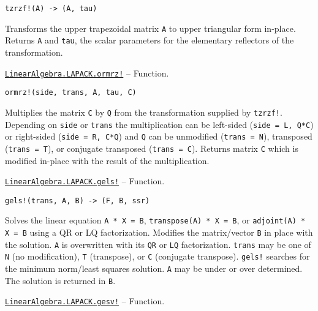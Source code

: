 \begin{adjustwidth}{2em}{0pt}


\begin{verbatim}
tzrzf!(A) -> (A, tau)
\end{verbatim}

Transforms the upper trapezoidal matrix \texttt{A} to upper triangular form in-place. Returns \texttt{A} and \texttt{tau}, the scalar parameters for the elementary reflectors of the transformation.



\end{adjustwidth}
\hypertarget{15550486828362807519}{} 
\hyperlink{15550486828362807519}{\texttt{LinearAlgebra.LAPACK.ormrz!}}  -- {Function.}

\begin{adjustwidth}{2em}{0pt}


\begin{verbatim}
ormrz!(side, trans, A, tau, C)
\end{verbatim}

Multiplies the matrix \texttt{C} by \texttt{Q} from the transformation supplied by \texttt{tzrzf!}. Depending on \texttt{side} or \texttt{trans} the multiplication can be left-sided (\texttt{side = L, Q*C}) or right-sided (\texttt{side = R, C*Q}) and \texttt{Q} can be unmodified (\texttt{trans = N}), transposed (\texttt{trans = T}), or conjugate transposed (\texttt{trans = C}). Returns matrix \texttt{C} which is modified in-place with the result of the multiplication.



\end{adjustwidth}
\hypertarget{18299455515085793306}{} 
\hyperlink{18299455515085793306}{\texttt{LinearAlgebra.LAPACK.gels!}}  -- {Function.}

\begin{adjustwidth}{2em}{0pt}


\begin{verbatim}
gels!(trans, A, B) -> (F, B, ssr)
\end{verbatim}

Solves the linear equation \texttt{A * X = B}, \texttt{transpose(A) * X = B}, or \texttt{adjoint(A) * X = B} using a QR or LQ factorization. Modifies the matrix/vector \texttt{B} in place with the solution. \texttt{A} is overwritten with its \texttt{QR} or \texttt{LQ} factorization. \texttt{trans} may be one of \texttt{N} (no modification), \texttt{T} (transpose), or \texttt{C} (conjugate transpose). \texttt{gels!} searches for the minimum norm/least squares solution. \texttt{A} may be under or over determined. The solution is returned in \texttt{B}.



\end{adjustwidth}
\hypertarget{1148095264829123239}{} 
\hyperlink{1148095264829123239}{\texttt{LinearAlgebra.LAPACK.gesv!}}  -- {Function.}

